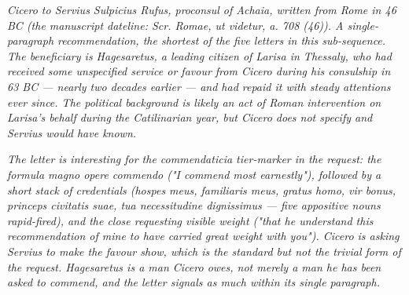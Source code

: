 
\textit{Cicero to Servius Sulpicius Rufus, proconsul of
Achaia, written from Rome in 46 BC (the manuscript
dateline: \textit{Scr. Romae, ut videtur, a. 708 (46)}).
A single-paragraph recommendation, the shortest of the
five letters in this sub-sequence. The beneficiary is
Hagesaretus, a leading citizen of Larisa in Thessaly,
who had received some unspecified service or favour
from Cicero during his consulship in 63 BC --- nearly
two decades earlier --- and had repaid it with steady
attentions ever since. The political background is
likely an act of Roman intervention on Larisa's behalf
during the Catilinarian year, but Cicero does not
specify and Servius would have known.}

\textit{The letter is interesting for the
\textit{commendaticia} tier-marker in the request: the
formula \textit{magno opere commendo} ("I commend most
earnestly"), followed by a short stack of credentials
(\textit{hospes meus, familiaris meus, gratus homo, vir
bonus, princeps civitatis suae, tua necessitudine
dignissimus} --- five appositive nouns rapid-fired), and
the close requesting visible weight ("that he understand
this recommendation of mine to have carried great
weight with you"). Cicero is asking Servius to make the
favour show, which is the standard but not the trivial
form of the request. Hagesaretus is a man Cicero owes,
not merely a man he has been asked to commend, and the
letter signals as much within its single paragraph.}
